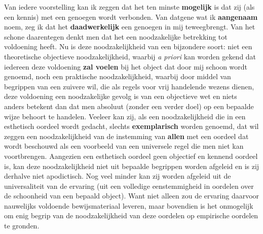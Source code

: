 Van iedere voorstelling kan ik zeggen dat het ten minste \textbf{mogelijk} is dat zij (als een kennis) met een genoegen wordt verbonden. Van datgene wat ik \textbf{aangenaam} noem, zeg ik dat het \textbf{daadwerkelijk} een genoegen in mij teweegbrengt. Van het schone daarentegen denkt men dat het een noodzakelijke betrekking tot voldoening heeft. Nu is deze noodzakelijkheid van een bijzondere soort: niet een theoretische objectieve noodzakelijkheid, waarbij \emph{a priori} kan worden gekend dat iedereen deze voldoening \textbf{zal voelen} bij het object dat door mij schoon wordt genoemd, noch een praktische noodzakelijkheid, waarbij door middel van begrippen van een zuivere wil, die als regels voor vrij handelende wezens dienen, deze voldoening een noodzakelijke gevolg is van een objectieve wet en niets anders betekent dan dat men absoluut (zonder een verder doel) op een bepaalde wijze behoort te handelen. Veeleer kan zij, als een noodzakelijkheid die in een esthetisch oordeel wordt gedacht, slechts \textbf{exemplarisch} worden genoemd, dat wil zeggen een noodzakelijkheid van de instemming van \textbf{allen} met een oordeel dat wordt beschouwd als een voorbeeld van een universele regel die men niet kan voortbrengen. Aangezien een esthetisch oordeel geen objectief en kennend oordeel is, kan deze noodzakelijkheid niet uit bepaalde begrippen worden afgeleid en is zij derhalve niet apodictisch. Nog veel minder kan zij worden afgeleid uit de universaliteit van de ervaring (uit een volledige eenstemmigheid in oordelen over de schoonheid van een bepaald object). Want niet alleen zou de ervaring daarvoor nauwelijks voldoende bewijsmateriaal leveren, maar bovendien is het onmogelijk om enig begrip van de noodzakelijkheid van deze oordelen op empirische oordelen te gronden.

